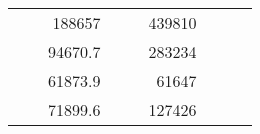 \begin{table}[H]
\begin{tabular}{|ccrccrccr}
\multicolumn{1}{|c|}{\cellcolor[HTML]{FFFFC7}}                                & \multicolumn{1}{c|}{\cellcolor[HTML]{DDFDFF}}                      & \multicolumn{1}{r|}{\cellcolor[HTML]{DAE8FC}188657}    & \multicolumn{1}{c|}{\cellcolor[HTML]{FFFFC7}}                                & \multicolumn{1}{c|}{\cellcolor[HTML]{DDFDFF}}                       & \multicolumn{1}{r|}{\cellcolor[HTML]{DDFDFF}439810}    &                                                                              &                                                                    &                                                        \\ \cline{3-3} \cline{6-6}
\multicolumn{1}{|c|}{\cellcolor[HTML]{FFFFC7}}                                & \multicolumn{1}{c|}{\cellcolor[HTML]{DDFDFF}}                      & \multicolumn{1}{r|}{\cellcolor[HTML]{DDFDFF}94670.7}   & \multicolumn{1}{c|}{\cellcolor[HTML]{FFFFC7}}                                & \multicolumn{1}{c|}{\cellcolor[HTML]{DDFDFF}}                       & \multicolumn{1}{r|}{\cellcolor[HTML]{DAE8FC}283234}    &                                                                              &                                                                    &                                                        \\ \cline{3-3} \cline{6-6}
\multicolumn{1}{|c|}{\cellcolor[HTML]{FFFFC7}}                                & \multicolumn{1}{c|}{\cellcolor[HTML]{DDFDFF}}                      & \multicolumn{1}{r|}{\cellcolor[HTML]{DAE8FC}61873.9}   & \multicolumn{1}{c|}{\cellcolor[HTML]{FFFFC7}}                                & \multicolumn{1}{c|}{\cellcolor[HTML]{DDFDFF}}                       & \multicolumn{1}{r|}{\cellcolor[HTML]{DDFDFF}61647}     &                                                                              &                                                                    &                                                        \\ \cline{3-3} \cline{6-6}
\multicolumn{1}{|c|}{\cellcolor[HTML]{FFFFC7}}                                & \multicolumn{1}{c|}{\cellcolor[HTML]{DDFDFF}}                      & \multicolumn{1}{r|}{\cellcolor[HTML]{DDFDFF}71899.6}   & \multicolumn{1}{c|}{\cellcolor[HTML]{FFFFC7}}                                & \multicolumn{1}{c|}{\cellcolor[HTML]{DDFDFF}}                       & \multicolumn{1}{r|}{\cellcolor[HTML]{DAE8FC}127426}    &                                                                              &                                                                    &                                                        \\ \cline{3-3} \cline{6-6}

\end{tabular}
\end{table}
